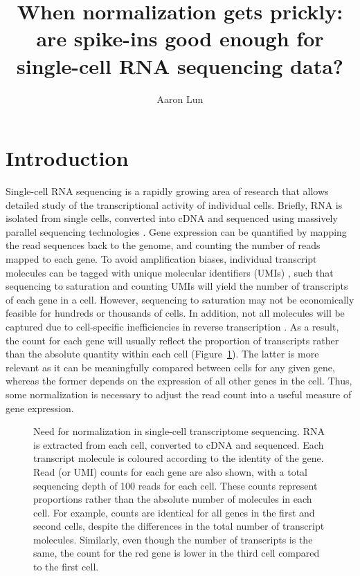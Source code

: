 \documentclass{article}
\title{When normalization gets prickly: are spike-ins good enough for single-cell RNA sequencing data?}
\author{Aaron Lun}
\begin{document}
\maketitle

\section{Introduction}
Single-cell RNA sequencing is a rapidly growing area of research that allows detailed study of the transcriptional activity of individual cells.
Briefly, RNA is isolated from single cells, converted into cDNA and sequenced using massively parallel sequencing technologies \cite{shapiro2013singlecell}.
Gene expression can be quantified by mapping the read sequences back to the genome, and counting the number of reads mapped to each gene.
To avoid amplification biases, individual transcript molecules can be tagged with unique molecular identifiers (UMIs) \cite{islam2014quantitative}, such that sequencing to saturation and counting UMIs will yield the number of transcripts of each gene in a cell.
However, sequencing to saturation may not be economically feasible for hundreds or thousands of cells.
In addition, not all molecules will be captured due to cell-specific inefficiencies in reverse transcription \cite{stegle2015computational}.
As a result, the count for each gene will usually reflect the proportion of transcripts rather than the absolute quantity within each cell (Figure~\ref{fig:cellexample}).
The latter is more relevant as it can be meaningfully compared between cells for any given gene, whereas the former depends on the expression of all other genes in the cell.
Thus, some normalization is necessary to adjust the read count into a useful measure of gene expression.

\begin{figure}[H]
\begin{center}
\end{center}
\caption{Need for normalization in single-cell transcriptome sequencing.
RNA is extracted from each cell, converted to cDNA and sequenced.
Each transcript molecule is coloured according to the identity of the gene.
Read (or UMI) counts for each gene are also shown, with a total sequencing depth of 100 reads for each cell.
These counts represent proportions rather than the absolute number of molecules in each cell.
For example, counts are identical for all genes in the first and second cells, despite the differences in the total number of transcript molecules. 
Similarly, even though the number of transcripts is the same, the count for the red gene is lower in the third cell compared to the first cell.
}
\label{fig:cellexample}
\end{figure}
\end{document}
